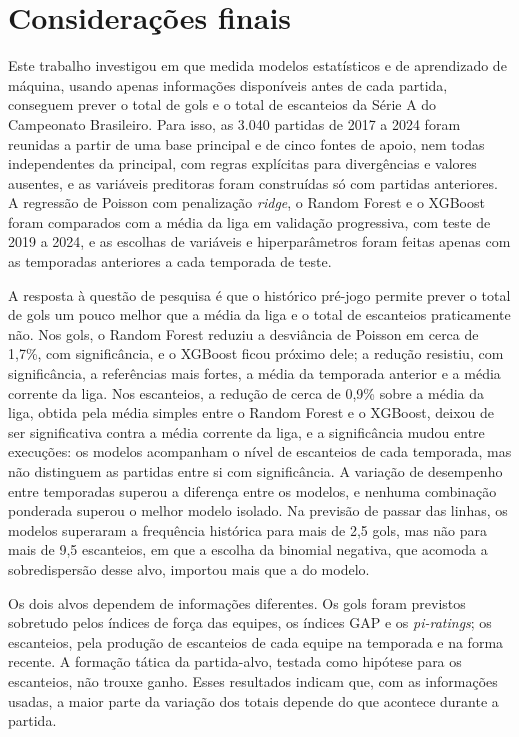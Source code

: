 \section{Considerações finais}\label{sec:Conclusion}

Este trabalho investigou em que medida modelos estatísticos e de aprendizado de máquina, usando apenas informações disponíveis antes de cada partida, conseguem prever o total de gols e o total de escanteios da Série A do Campeonato Brasileiro. Para isso, as 3.040 partidas de 2017 a 2024 foram reunidas a partir de uma base principal e de cinco fontes de apoio, nem todas independentes da principal, com regras explícitas para divergências e valores ausentes, e as variáveis preditoras foram construídas só com partidas anteriores. A regressão de Poisson com penalização \textit{ridge}, o Random Forest e o XGBoost foram comparados com a média da liga em validação progressiva, com teste de 2019 a 2024, e as escolhas de variáveis e hiperparâmetros foram feitas apenas com as temporadas anteriores a cada temporada de teste.

A resposta à questão de pesquisa é que o histórico pré-jogo permite prever o total de gols um pouco melhor que a média da liga e o total de escanteios praticamente não. Nos gols, o Random Forest reduziu a desviância de Poisson em cerca de 1,7\%, com significância, e o XGBoost ficou próximo dele; a redução resistiu, com significância, a referências mais fortes, a média da temporada anterior e a média corrente da liga. Nos escanteios, a redução de cerca de 0,9\% sobre a média da liga, obtida pela média simples entre o Random Forest e o XGBoost, deixou de ser significativa contra a média corrente da liga, e a significância mudou entre execuções: os modelos acompanham o nível de escanteios de cada temporada, mas não distinguem as partidas entre si com significância. A variação de desempenho entre temporadas superou a diferença entre os modelos, e nenhuma combinação ponderada superou o melhor modelo isolado. Na previsão de passar das linhas, os modelos superaram a frequência histórica para mais de 2,5 gols, mas não para mais de 9,5 escanteios, em que a escolha da binomial negativa, que acomoda a sobredispersão desse alvo, importou mais que a do modelo.

Os dois alvos dependem de informações diferentes. Os gols foram previstos sobretudo pelos índices de força das equipes, os índices GAP e os \textit{pi-ratings}; os escanteios, pela produção de escanteios de cada equipe na temporada e na forma recente. A formação tática da partida-alvo, testada como hipótese para os escanteios, não trouxe ganho. Esses resultados indicam que, com as informações usadas, a maior parte da variação dos totais depende do que acontece durante a partida.

